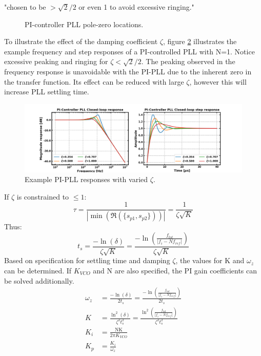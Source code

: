 			"chosen to be $>\sqrt{2}/2$ or even 1 to avoid excessive ringing."
			\begin{figure}[htb!]
				\center
				\caption{PI-controller PLL pole-zero locations.}
				\label{fig:pi_pll_pz}
			\end{figure}
			\FloatBarrier
			To illustrate the effect of the damping coefficient $\zeta$, figure \ref{fig:pi_pll_response} illustrates the example frequency and step responses of a PI-controlled PLL with N=1. Notice excessive peaking and ringing for $\zeta<\sqrt{2}/2$. The peaking observed in the frequency response is unavoidable with the PI-PLL due to the inherent zero in the transfer function. Its effect can be reduced with large $\zeta$, however this will increase PLL settling time. 
			\begin{figure}[htb!]
				\center\includegraphics[width=1.0\textwidth, angle=0]{figs/pi_pll_response2.png}
				\caption{Example PI-PLL responses with varied $\zeta$.}
				\label{fig:pi_pll_response}
			\end{figure}
			\FloatBarrier
			If $\zeta$ is constrained to $\leq 1$:
			\begin{equation}
				\tau = \frac{1}{|\min(\Re(\{s_{p1}, s_{p2}\}))|} = \frac{1}{\zeta\sqrt{K}}
			\end{equation}
			Thus:
			\begin{equation}
				t_s = \frac{-\ln(\delta)}{\zeta\sqrt{K}} = \frac{-\ln\left(\frac{f_{tol}}{|f_i - Nf_{ref}|}\right)}{\zeta\sqrt{K}} 
			\end{equation}
			Based on specification for settling time and damping $\zeta$, the values for K and $\omega_z$ can be determined. If $K_{VCO}$ and $\mathrm{N}$ are also specified, the PI gain coefficients can be solved additionally.
			\begin{align}
				\omega_z &= \frac{-\ln(\delta)}{2t_s} =  \frac{-\ln\left(\frac{f_{tol}}{|f_i - Nf_{ref}|}\right)}{2t_s}\\
				K &= \frac{\ln^2(\delta)}{\zeta^2t_s^2} =  \frac{\ln^2\left(\frac{f_{tol}}{|f_i - Nf_{ref}|}\right)}{\zeta^2t_s^2}\\
				K_i & = \frac{\mathrm{N}\mathrm{K}}{2\pi K_{VCO}} \\
				K_p & = \frac{K_i}{\omega_z}
			\end{align}

